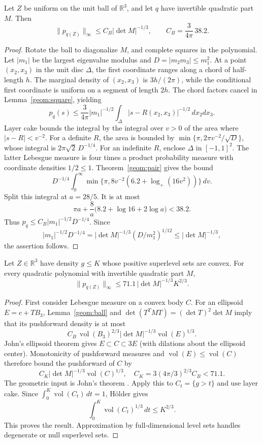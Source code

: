 \begin{lemma}\label{geom:ball}
Let $Z$ be uniform on the unit ball of $\mathbb R^3$, and let $q$ have invertible quadratic part $M$. Then
\[
 \|p_{q(Z)}\|_\infty\le C_B|\det M|^{-1/3},\qquad
 C_B=\frac3{4\pi}\,38.2.
\]
\end{lemma}
\begin{proof}
Rotate the ball to diagonalize $M$, and complete squares in the polynomial. Let $|m_1|$ be the largest eigenvalue modulus and $D=|m_2m_3|\le m_1^2$. At a point $(x_2,x_3)$ in the unit disc $\Delta$, the first coordinate ranges along a chord of half-length $h$. The marginal density of $(x_2,x_3)$ is $3h/(2\pi)$, while the conditional first coordinate is uniform on a segment of length $2h$. The chord factors cancel in Lemma~\ref{geom:square}, yielding
\[
 p_q(s)\le\frac3{4\pi}|m_1|^{-1/2}
 \int_\Delta|s-R(x_2,x_3)|^{-1/2}\,dx_2dx_3.
\]
Layer cake bounds the integral by the integral over $v>0$ of the area where $|s-R|<v^{-2}$. For a definite $R$, the area is bounded by $\min\{\pi,2\pi v^{-2}/\sqrt D\}$, whose integral is $2\pi\sqrt2\,D^{-1/4}$. For an indefinite $R$, enclose $\Delta$ in $[-1,1]^2$. The latter Lebesgue measure is four times a product probability measure with coordinate densities $1/2\le1$. Theorem~\ref{geom:pair} gives the bound
\[
 D^{-1/4}\int_0^\infty\min\{\pi,8v^{-2}(6.2+\log_+(16v^2))\}\,dv.
\]
Split this integral at $a=28/5$. It is at most
\[
 \pi a+\frac8a\bigl(8.2+\log16+2\log a\bigr)<38.2.
\]
Thus $p_q\le C_B|m_1|^{-1/2}D^{-1/4}$. Since
\[
 |m_1|^{-1/2}D^{-1/4}
 =|\det M|^{-1/3}(D/m_1^2)^{1/12}\le|\det M|^{-1/3},
\]
the assertion follows.
\end{proof}

\begin{theorem}\label{geom:convex}
Let $Z\in\mathbb R^3$ have density $g\le K$ whose positive superlevel sets are convex. For every quadratic polynomial with invertible quadratic part $M$,
\begin{equation}\label{eq:convex-density}
 \|p_{q(Z)}\|_\infty\le71.1\,|\det M|^{-1/3}K^{2/3}.
\end{equation}
\end{theorem}
\begin{proof}
First consider Lebesgue measure on a convex body $C$. For an ellipsoid $E=c+TB_3$, Lemma~\ref{geom:ball} and $\det(T^TMT)=(\det T)^2\det M$ imply that its pushforward density is at most
\[
 C_B\,\operatorname{vol}(B_3)^{2/3}|\det M|^{-1/3}\operatorname{vol}(E)^{1/3}.
\]
John's ellipsoid theorem gives $E\subset C\subset3E$ (with dilations about the ellipsoid center). Monotonicity of pushforward measures and $\operatorname{vol}(E)\le\operatorname{vol}(C)$ therefore bound the pushforward of $C$ by
\[
 C_K|\det M|^{-1/3}\operatorname{vol}(C)^{1/3},\quad
 C_K=3(4\pi/3)^{2/3}C_B<71.1.
\]
The geometric input is John's theorem \citep{John1948}. Apply this to $C_t=\{g>t\}$ and use layer cake. Since $\int_0^K\operatorname{vol}(C_t)\,dt=1$, H\"older gives
\[
 \int_0^K\operatorname{vol}(C_t)^{1/3}\,dt\le K^{2/3}.
\]
This proves the result. Approximation by full-dimensional level sets handles degenerate or null superlevel sets.
\end{proof}

